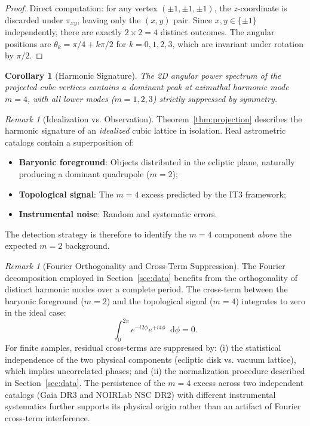 \documentclass[11pt,a4paper]{article}
\newtheorem{corollary}[theorem]{Corollary}
\theoremstyle{remark}
\newtheorem{remark}[theorem]{Remark}
\newcommand{\dd}{\mathop{}\!\mathrm{d}}
\begin{document}
\begin{proof}
Direct computation: for any vertex $(\pm 1, \pm 1, \pm 1)$, the $z$-coordinate is discarded under $\pi_{xy}$, leaving only the $(x,y)$ pair. Since $x,y \in \{\pm 1\}$ independently, there are exactly $2 \times 2 = 4$ distinct outcomes. The angular positions are $\theta_k = \pi/4 + k\pi/2$ for $k=0,1,2,3$, which are invariant under rotation by $\pi/2$.
\end{proof}

\begin{corollary}[Harmonic Signature]
\label{cor:harmonic}
The 2D angular power spectrum of the projected cube vertices contains a dominant peak at azimuthal harmonic mode $m=4$, with all lower modes ($m=1,2,3$) strictly suppressed by symmetry.
\end{corollary}

\begin{remark}[Idealization vs. Observation]
\label{rem:idealization}
Theorem~\ref{thm:projection} describes the harmonic signature of an \textit{idealized} cubic lattice in isolation. Real astrometric catalogs contain a superposition of:
\begin{itemize}
\item \textbf{Baryonic foreground}: Objects distributed in the ecliptic plane, naturally producing a dominant quadrupole ($m=2$);
\item \textbf{Topological signal}: The $m=4$ excess predicted by the IT3 framework;
\item \textbf{Instrumental noise}: Random and systematic errors.
\end{itemize}
The detection strategy is therefore to identify the $m=4$ component \textit{above} the expected $m=2$ background.
\end{remark}

\begin{remark}[Fourier Orthogonality and Cross-Term Suppression]
\label{rem:orthogonality}
The Fourier decomposition employed in Section~\ref{sec:data} benefits from the orthogonality of distinct harmonic modes over a complete period. The cross-term between the baryonic foreground ($m=2$) and the topological signal ($m=4$) integrates to zero in the ideal case:
\[
\int_0^{2\pi} e^{-i2\phi} e^{+i4\phi} \dd\phi = 0.
\]
For finite samples, residual cross-terms are suppressed by: (i) the statistical independence of the two physical components (ecliptic disk vs. vacuum lattice), which implies uncorrelated phases; and (ii) the normalization procedure described in Section~\ref{sec:data}. The persistence of the $m=4$ excess across two independent catalogs (Gaia DR3 and NOIRLab NSC DR2) with different instrumental systematics further supports its physical origin rather than an artifact of Fourier cross-term interference.
\end{remark}
\end{document}
